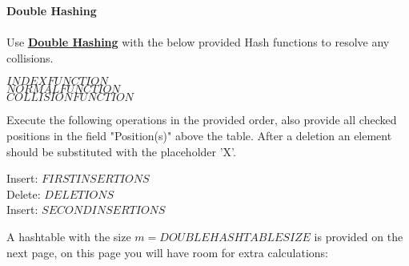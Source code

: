 \documentclass[12pt]{article}
\begin{document}
    \textbf{\LARGE{\color{tumgadPurple} Double Hashing}}\\
    \\
    \noindent
    Use \href{https://sebastianoner.github.io/TUMGAD/src/Algorithms/Hashing/Double/DoubleHashing}{\textbf{\underline{Double Hashing}}} with
    the below provided Hash functions to resolve any collisions.
    \begin{center}
        $INDEXFUNCTION$\\
        $NORMALFUNCTION$\\
        $COLLISIONFUNCTION$\\
    \end{center}
    Execute the following operations in the provided order, also provide all checked positions in the field "Position(s)" above the table.
    After a deletion an element should be substituted with the placeholder 'X'.\\
    \begin{center}
        Insert: $FIRSTINSERTIONS$\\
        Delete: $DELETIONS$\\
        Insert: $SECONDINSERTIONS$\\
    \end{center}
    A hashtable with the size $m = DOUBLEHASHTABLESIZE$ is provided on the next page, on this page you will have room for extra calculations:\\
    \newline
    \noindent\fbox{
        \parbox{\textwidth}{
            \vspace{12cm}
            \hspace{11cm}
        }
    }
    \newpage
\end{document}
